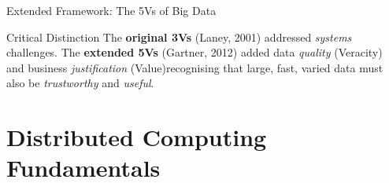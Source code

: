 \documentclass[aspectratio=169,10pt]{beamer}
\begin{document}
\begin{frame}{Extended Framework: The 5Vs of Big Data}




  \begin{alertblock}{Critical Distinction}
    The \textbf{original 3Vs} (Laney, 2001) addressed \emph{systems} challenges.  The \textbf{extended 5Vs} (Gartner, 2012) added data \emph{quality} (Veracity) and business \emph{justification} (Value)\textemdash recognising that large, fast, varied data must also be \emph{trustworthy} and \emph{useful}.
  \end{alertblock}
\end{frame}
\section{Distributed Computing Fundamentals}
\end{document}
